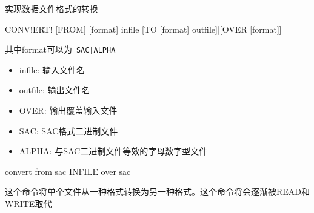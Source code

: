 \label{cmd:convert}

实现数据文件格式的转换

\begin{SACSTX}
CONV!ERT! [FROM] [format] infile [TO [format] outfile]|[OVER [format]]
\end{SACSTX}
其中format可以为~\lstinline{SAC|ALPHA}

\begin{itemize}
\item infile: 输入文件名
\item outfile: 输出文件名
\item OVER: 输出覆盖输入文件
\item SAC: SAC格式二进制文件
\item ALPHA: 与SAC二进制文件等效的字母数字型文件
\end{itemize}

\begin{SACDFT}
convert from sac INFILE over sac
\end{SACDFT}

这个命令将单个文件从一种格式转换为另一种格式。这个命令将会逐渐被READ和WRITE取代
